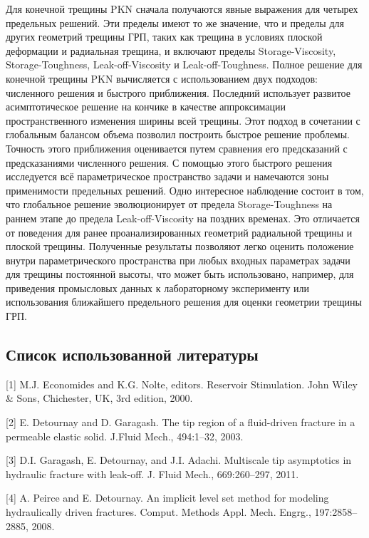 \documentclass[main.tex]{subfiles}
\begin{document}
Для конечной трещины PKN сначала получаются явные выражения для четырех предельных решений.
Эти пределы имеют то же значение, что и пределы для других геометрий трещины ГРП, таких как трещина в условиях плоской деформации и радиальная трещина, и включают пределы Storage-Viscosity, Storage-Toughness, Leak-off-Viscosity и Leak-off-Toughness.
Полное решение для конечной трещины PKN вычисляется с использованием двух подходов: численного решения и быстрого приближения.
Последний использует развитое асимптотическое решение на кончике в качестве аппроксимации пространственного изменения ширины всей трещины.
Этот подход в сочетании с глобальным балансом объема позволил построить быстрое решение проблемы.
Точность этого приближения оценивается путем сравнения его предсказаний с предсказаниями численного решения.
С помощью этого быстрого решения исследуется всё параметрическое пространство задачи и намечаются зоны применимости предельных решений.
Одно интересное наблюдение состоит в том, что глобальное решение эволюционирует от предела Storage-Toughness на раннем этапе до предела Leak-off-Viscosity на поздних временах.
Это отличается от поведения для ранее проанализированных геометрий радиальной трещины и плоской трещины.
Полученные результаты позволяют легко оценить положение внутри параметрического пространства при любых входных параметрах задачи для трещины постоянной высоты, что может быть использовано, например, для приведения промысловых данных к лабораторному эксперименту или использования ближайшего предельного решения для оценки геометрии трещины ГРП.

\subsection*{Список использованной литературы}

[1] M.J. Economides and K.G. Nolte, editors. Reservoir Stimulation. John Wiley \& Sons, Chichester, UK, 3rd edition, 2000.

[2] E. Detournay and D. Garagash. The tip region of a fluid-driven fracture in a permeable elastic solid. J.Fluid Mech., 494:1–32, 2003.

[3] D.I. Garagash, E. Detournay, and J.I. Adachi. Multiscale tip asymptotics in hydraulic fracture with leak-off. J. Fluid Mech., 669:260–297, 2011.

[4] A. Peirce and E. Detournay. An implicit level set method for modeling hydraulically driven fractures. Comput. Methods Appl. Mech. Engrg., 197:2858–2885, 2008.
\end{document}
